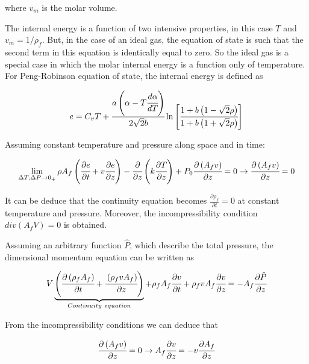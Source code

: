 \documentclass[../Article_Model_Parameters.tex]{subfiles}
\begin{document}
	where $v_m$ is the molar volume.
	
	The internal energy is a function of two intensive properties, in this case $T$ and $v_m=1/\rho_f$. But, in the case of an ideal gas, the equation of state is such that the second term in this equation is identically equal to zero. So the ideal gas is a special case in which the molar internal energy is a function only of temperature. For Peng-Robinson equation of state, the internal energy is defined as 
	
	{\footnotesize
	\begin{equation*}
		e = C_vT + \cfrac{a\left(\alpha -T\cfrac{d \alpha}{dT}\right)}{2\sqrt{2}b} \ln \left[ \cfrac{1+b\left(1-\sqrt{2}\rho\right) }{1+b\left(1+\sqrt{2}\rho\right)} \right]
	\end{equation*} }


	Assuming constant temperature and pressure along space and in time:
	
	{\footnotesize
		\begin{equation*}
			\lim_{\Delta T, \Delta P \rightarrow 0_+ } \rho A_f \left( \cfrac{\partial e }{\partial t} + v \cfrac{\partial e}{\partial z} \right) - \cfrac{\partial}{\partial z} \left( k \cfrac{\partial T}{\partial z} \right) + P_0 \cfrac{\partial \left(A_f v\right)}{\partial z} = 0 \rightarrow \cfrac{\partial \left(A_f v\right)}{\partial z} = 0
		\end{equation*}
	}
	
	It can be deduce that the continuity equation becomes $\frac{\partial \rho_f}{\partial t} = 0$ at constant temperature and pressure. Moreover, the incompressibility condition $div(A_fV)=0$ is obtained.
	
	Assuming an arbitrary function $\hat{P}$, which describe the total pressure, the dimensional momentum equation can be written as
	
	{\footnotesize
		\begin{equation*}
			V \underbrace{ \left( \cfrac{\partial \left(\rho_f A_f\right)}{\partial t} + \cfrac{\left(\rho_f v A_f\right)}{\partial z} \right) }_{Continuity~equation} + \rho_f A_f \cfrac{\partial v}{\partial t} + \rho_f v A_f \cfrac{\partial v}{\partial z} = - A_f \cfrac{\partial \hat{P}}{\partial z}
		\end{equation*}
	}
	
	From the incompressibility conditions we can deduce that
	
	{\footnotesize
		\begin{equation*}
			\cfrac{\partial \left(A_f v\right)}{\partial z} = 0 \rightarrow A_f \cfrac{\partial v}{\partial z} = - v \cfrac{\partial A_f}{\partial z}
		\end{equation*}
	}
	
\end{document}
